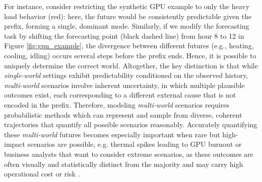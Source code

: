 \documentclass[a4paper,oneside,bibliography=totoc]{scrbook}
\begin{document}
For instance, consider restricting the synthetic GPU example to only the heavy load behavior (red): here, the future would be consistently predictable given the prefix, forming a single, dominant mode. 
Similarly, if we modify the forecasting task by shifting the forecasting point (black dashed line) from hour 8 to 12 in Figure \ref{fig:gpu_example}, the divergence between different futures (e.g., heating, cooling, idling) occurs several steps before the prefix ends. Hence, it is possible to uniquely determine the correct world.
Altogether, the key distinction is that while \textit{single-world} settings exhibit predictability conditioned on the observed history, \textit{multi-world} scenarios involve inherent uncertainty, in which multiple plausible outcomes exist, each corresponding to a different external cause that is not encoded in the prefix.
Therefore, modeling \textit{multi-world} scenarios requires probabilistic methods which can represent and sample from diverse, coherent trajectories that quantify all possible scenarios reasonably.
Accurately quantifying these \textit{multi-world} futures becomes especially important when rare but high-impact scenarios are possible, e.g. thermal spikes leading to GPU burnout or business analysts that want to consider extreme scenarios, as these outcomes are often visually and statistically distinct from the majority and may carry high operational cost or risk \cite{kan_multivariate_2022, wen_multi-horizon_2018}.
\\
\end{document}
